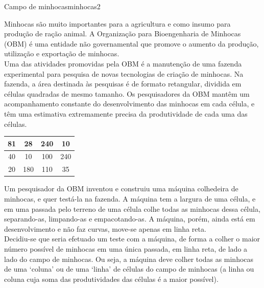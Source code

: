 \documentclass[12pt,a4paper,oneside]{article}
\begin{document}
\begin{problem}{Campo de minhocas}{minhocas}{2}

Minhocas são muito importantes para a agricultura e como insumo para produção de ração animal. A Organização para Bioengenharia de Minhocas (OBM) é uma entidade não governamental que promove o aumento da produção, utilização e exportação de minhocas.\\[-18pt]

Uma das atividades promovidas pela OBM é a manutenção de uma fazenda experimental para pesquisa de novas tecnologias de criação de minhocas. Na fazenda, a área destinada às pesquisas é de formato retangular, dividida em células quadradas de mesmo tamanho. %
Os pesquisadores da OBM mantêm um acompanhamento constante do desenvolvimento das minhocas em cada célula, e têm uma estimativa extremamente precisa da produtividade de cada uma das células.\\[-18pt]

\begin{center}
\begin{tabular}{|c|c|c|c|}
\hline
81 & 28 & 240 & 10 \\
\hline
40 & 10 & 100 & 240 \\
\hline
20 & 180 & 110 & 35 \\
\hline
\end{tabular}
\end{center}
\vspace{-6pt}

Um pesquisador da OBM inventou e construiu uma máquina colhedeira de minhocas, e quer testá-la na fazenda. A máquina tem a largura de uma célula, e em uma passada pelo terreno de uma célula colhe todas as minhocas dessa célula, separando-as, limpando-as e empacotando-as.
A máquina, porém, ainda está em desenvolvimento e %
não faz curvas, move-se apenas em linha reta.\\[-18pt]

Decidiu-se %
que seria efetuado um teste com a máquina, de forma a colher o maior número possível de minhocas em uma única passada, em linha reta, de lado a lado do campo de minhocas. Ou seja, a máquina deve colher todas as minhocas de uma `coluna' ou de uma `linha' de células do campo de minhocas (a linha ou coluna cuja soma das produtividades %
das células é a maior possível).\\[-18pt]


\end{problem}
\end{document}
